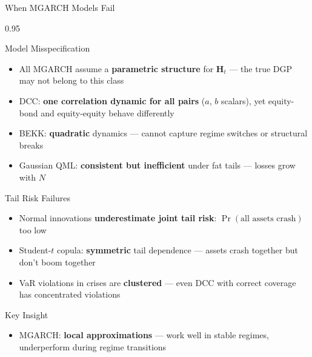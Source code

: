 \documentclass[9pt, aspectratio=169, t]{beamer}
\begin{document}
\begin{frame}{When MGARCH Models Fail}
    \begin{cminipage}{0.95\textwidth}
    \vspace{-4mm}
    {\scriptsize
    \begin{block}{Model Misspecification}
        \begin{itemize}\setlength{\itemsep}{0pt}
            \item All MGARCH assume a \textbf{parametric structure} for $\mathbf{H}_t$ --- the true DGP may not belong to this class
            \item DCC: \textbf{one correlation dynamic for all pairs} ($a$, $b$ scalars), yet equity-bond and equity-equity behave differently
            \item BEKK: \textbf{quadratic} dynamics --- cannot capture regime switches or structural breaks
            \item Gaussian QML: \textbf{consistent but inefficient} under fat tails --- losses grow with $N$
        \end{itemize}
    \end{block}
    \vspace{-3mm}
    \begin{block}{Tail Risk Failures}
        \begin{itemize}\setlength{\itemsep}{0pt}
            \item Normal innovations \textbf{underestimate joint tail risk}: $\Pr(\text{all assets crash})$ too low
            \item Student-$t$ copula: \textbf{symmetric} tail dependence --- assets crash together but don't boom together
            \item VaR violations in crises are \textbf{clustered} --- even DCC with correct coverage has concentrated violations
        \end{itemize}
    \end{block}
    \vspace{-3mm}
    \begin{alertblock}{Key Insight}
        \begin{itemize}\setlength{\itemsep}{0pt}
            \item MGARCH: \textbf{local approximations} --- work well in stable regimes, underperform during regime transitions
        \end{itemize}
    \end{alertblock}
    }
    \end{cminipage}
\end{frame}
\end{document}
